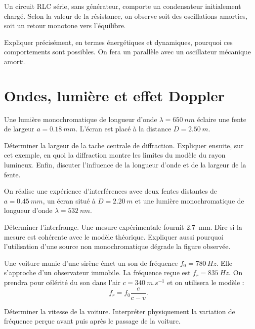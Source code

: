 \documentclass[11pt,a4paper]{article}
\newcommand{\etoiles}[1]{%
\textcolor{orange!90!black}{%
\ifnum#1=1 ★\fi
\ifnum#1=2 ★★\fi
\ifnum#1=3 ★★★\fi
\ifnum#1=4 ★★★★\fi
\ifnum#1=5 ★★★★★\fi}}
\newcommand{\exercice}[3]{
\begin{tcolorbox}[colback=white,colframe=bleu,title={\textbf{Exercice #1 -- #2 \hfill Niveau : \etoiles{#3}}}]
}
\newcommand{\finexercice}{
\end{tcolorbox}
}
\begin{document}
\exercice{7}{Oscillateur électrique amorti : interprétation physique}{4}

Un circuit RLC série, sans générateur, comporte un condensateur initialement chargé. Selon la valeur de la résistance, on observe soit des oscillations amorties, soit un retour monotone vers l'équilibre.

Expliquer précisément, en termes énergétiques et dynamiques, pourquoi ces comportements sont possibles. On fera un parallèle avec un oscillateur mécanique amorti.
\finexercice

\section{Ondes, lumière et effet Doppler}

\exercice{8}{Diffraction : quand l'optique géométrique cesse d'être valable}{4}

Une lumière monochromatique de longueur d'onde $\lambda=\SI{650}{nm}$ éclaire une fente de largeur $a=\SI{0.18}{mm}$. L'écran est placé à la distance $D=\SI{2.50}{m}$.

Déterminer la largeur de la tache centrale de diffraction. Expliquer ensuite, sur cet exemple, en quoi la diffraction montre les limites du modèle du rayon lumineux. Enfin, discuter l'influence de la longueur d'onde et de la largeur de la fente.
\finexercice

\exercice{9}{Interférences de Young et cohérence du modèle}{4}

On réalise une expérience d'interférences avec deux fentes distantes de $a=\SI{0.45}{mm}$, un écran situé à $D=\SI{2.20}{m}$ et une lumière monochromatique de longueur d'onde $\lambda=\SI{532}{nm}$.

Déterminer l'interfrange. Une mesure expérimentale fournit \SI{2.7}{mm}. Dire si la mesure est cohérente avec le modèle théorique. Expliquer aussi pourquoi l'utilisation d'une source non monochromatique dégrade la figure observée.
\finexercice

\exercice{10}{Effet Doppler : mesure de la vitesse d'une voiture}{4}

Une voiture munie d'une sirène émet un son de fréquence $f_0=\SI{780}{Hz}$. Elle s'approche d'un observateur immobile. La fréquence reçue est $f_r=\SI{835}{Hz}$. On prendra pour célérité du son dans l'air $c=\SI{340}{m.s^{-1}}$ et on utilisera le modèle :
\[
f_r = f_0 \frac{c}{c-v}.
\]

Déterminer la vitesse de la voiture. Interpréter physiquement la variation de fréquence perçue avant puis après le passage de la voiture.
\finexercice
\end{document}
